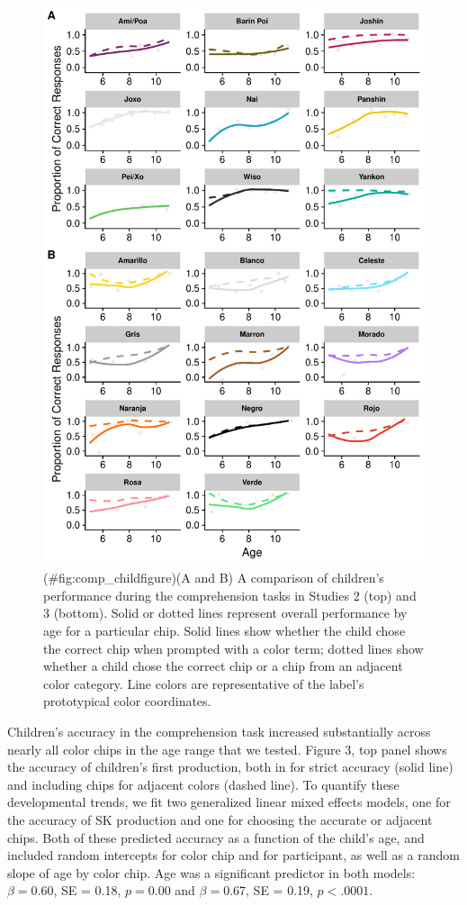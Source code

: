 \documentclass[,man,floatsintext]{apa6}
\theoremstyle{definition}
\theoremstyle{definition}
\theoremstyle{definition}
\theoremstyle{remark}
\begin{document}
\begin{figure}
\centering
\includegraphics{amazon_color_files/figure-latex/comp_childfigure-1.pdf}
\caption{(\#fig:comp\_childfigure)(A and B) A comparison of children's
performance during the comprehension tasks in Studies 2 (top) and 3
(bottom). Solid or dotted lines represent overall performance by age for
a particular chip. Solid lines show whether the child chose the correct
chip when prompted with a color term; dotted lines show whether a child
chose the correct chip or a chip from an adjacent color category. Line
colors are representative of the label's prototypical color
coordinates.}
\end{figure}

Children's accuracy in the comprehension task increased substantially
across nearly all color chips in the age range that we tested. Figure 3,
top panel shows the accuracy of children's first production, both in for
strict accuracy (solid line) and including chips for adjacent colors
(dashed line). To quantify these developmental trends, we fit two
generalized linear mixed effects models, one for the accuracy of SK
production and one for choosing the accurate or adjacent chips. Both of
these predicted accuracy as a function of the child's age, and included
random intercepts for color chip and for participant, as well as a
random slope of age by color chip. Age was a significant predictor in
both models: \(\beta = 0.60\), SE = 0.18, \(p = 0.00\) and
\(\beta = 0.67\), SE = 0.19, \(p < .0001\).
\end{document}
